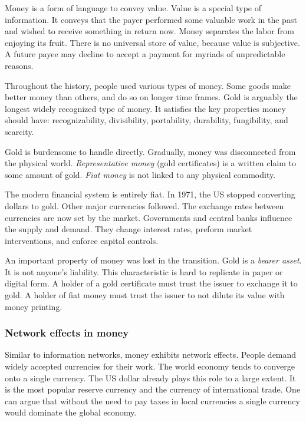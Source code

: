 Money is a form of language to convey value.
Value is a special type of information.
It conveys that the payer performed some valuable work in the past and wished to receive something in return now.
Money separates the labor from enjoying its fruit.
There is no universal store of value, because value is subjective.
A future payee may decline to accept a payment for myriads of unpredictable reasons.

Throughout the history, people used various types of money.
Some goods make better money than others, and do so on longer time frames.
Gold is arguably the longest widely recognized type of money.
It satisfies the key properties money should have: recognizability, divisibility, portability, durability, fungibility, and scarcity.

Gold is burdensome to handle directly.
Gradually, money was disconnected from the physical world.
\textit{Representative money} (gold certificates) is a written claim to some amount of gold.
\textit{Fiat money} is not linked to any physical commodity.

The modern financial system is entirely fiat.
In 1971, the US stopped converting dollars to gold.
Other major currencies followed.
The exchange rates between currencies are now set by the market.
Governments and central banks influence the supply and demand.
They change interest rates, preform market interventions, and enforce capital controls.

An important property of money was lost in the transition.
Gold is a \textit{bearer asset}.
It is not anyone's liability.
This characteristic is hard to replicate in paper or digital form.
A holder of a gold certificate must trust the issuer to exchange it to gold.
A holder of fiat money must trust the issuer to not dilute its value with money printing.


\subsubsection*{Network effects in money}

Similar to information networks, money exhibits network effects.
People demand widely accepted currencies for their work.
The world economy tends to converge onto a single currency.
The US dollar already plays this role to a large extent.
It is the most popular reserve currency and the currency of international trade.
One can argue that without the need to pay taxes in local currencies a single currency would dominate the global economy.


